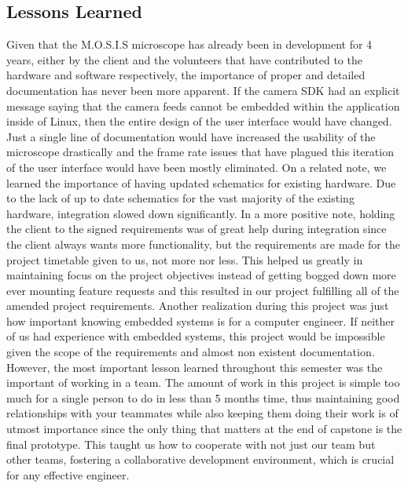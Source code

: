 \subsection{Lessons Learned}
Given that the M.O.S.I.S microscope has already been in development for 4 years, either by the client and the volunteers that have contributed to the hardware and software respectively, the importance of proper and detailed documentation has never been more apparent. If the camera SDK had an explicit message saying that the camera feeds cannot be embedded within the application inside of Linux, then the entire design of the user interface would have changed. Just a single line of documentation would have increased the usability of the microscope drastically and the frame rate issues that have plagued this iteration of the user interface would have been mostly eliminated. On a related note, we learned the importance of having updated schematics for existing hardware. Due to the lack of up to date schematics for the vast majority of the existing hardware, integration slowed down significantly. In a more positive note, holding the client to the signed requirements was of great help during integration since the client always wants more functionality, but the requirements are made for the project timetable given to us, not more nor less. This helped us greatly in maintaining focus on the project objectives instead of getting bogged down more ever mounting feature requests and this resulted in our project fulfilling all of the amended project requirements. Another realization during this project was just how important knowing embedded systems is for a computer engineer. If neither of us had experience with embedded systems, this project would be impossible given the scope of the requirements and almost non existent documentation. However, the most important lesson learned throughout this semester was the important of working in a team. The amount of work in this project is simple too much for a single person to do in less than 5 months time, thus maintaining good relationships with your teammates while also keeping them doing their work is of utmost importance since the only thing that matters at the end of capstone is the final prototype. This taught us how to cooperate with not just our team but other teams, fostering a collaborative development environment, which is crucial for any effective engineer.